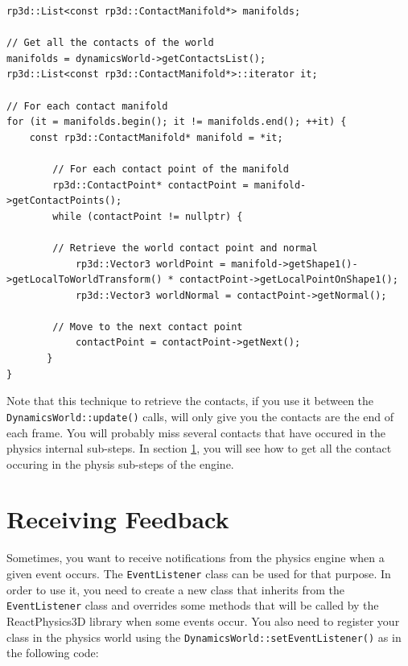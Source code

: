 \documentclass[a4paper,12pt]{article}
\begin{document}
    \begin{lstlisting}
rp3d::List<const rp3d::ContactManifold*> manifolds;

// Get all the contacts of the world
manifolds = dynamicsWorld->getContactsList();
rp3d::List<const rp3d::ContactManifold*>::iterator it;

// For each contact manifold 
for (it = manifolds.begin(); it != manifolds.end(); ++it) {
    const rp3d::ContactManifold* manifold = *it;

        // For each contact point of the manifold
        rp3d::ContactPoint* contactPoint = manifold->getContactPoints();
        while (contactPoint != nullptr) {

	    // Retrieve the world contact point and normal
            rp3d::Vector3 worldPoint = manifold->getShape1()->getLocalToWorldTransform() * contactPoint->getLocalPointOnShape1();
            rp3d::Vector3 worldNormal = contactPoint->getNormal();

	    // Move to the next contact point
            contactPoint = contactPoint->getNext();
       }
}
    \end{lstlisting}

     \vspace{0.6cm}

    Note that this technique to retrieve the contacts, if you use it between the \texttt{DynamicsWorld::update()} calls, will only give you the contacts are the end of
    each frame. You will probably miss several contacts that have occured in the physics internal sub-steps. In section \ref{sec:receiving_feedback}, you will
    see how to get all the contact occuring in the physis sub-steps of the engine. 

    \section{Receiving Feedback}

    \label{sec:receiving_feedback}
    Sometimes, you want to receive notifications from the physics engine when a given event occurs. The \texttt{EventListener} class can be used for that purpose. In order to use
    it, you need to create a new class that inherits from the \texttt{EventListener} class and overrides some methods that will be called by the ReactPhysics3D library when some events
    occur. You also need to register your class in the physics world using the \texttt{DynamicsWorld::setEventListener()} as in the following code: \\
\end{document}
